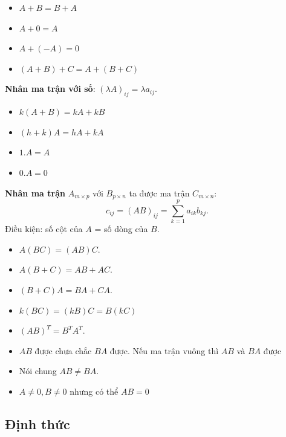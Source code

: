 \documentclass[12pt,a4paper]{article}
\begin{document}
\begin{tinhchat}
  \begin{itemize}
    \item $A + B = B + A$
    \item $A + 0 = A$
    \item $A + (-A) = 0$
    \item $(A + B) + C = A + (B + C)$
  \end{itemize}
\end{tinhchat}

\begin{dinhnghia}
  \textbf{Nhân ma trận với số}: $(\lambda A)_{ij} = \lambda a_{ij}$.
\end{dinhnghia}

\begin{tinhchat}
  \begin{itemize}
    \item $k(A + B) = kA + kB$
    \item $(h + k)A = hA + kA$
    \item $1.A = A$
    \item $0.A = 0$
  \end{itemize}
\end{tinhchat}

\begin{dinhnghia}
  \textbf{Nhân ma trận} $A_{m \times p}$ với $B_{p \times n}$ ta được ma trận $C_{m \times n}$:
  \[
    c_{ij} = (AB)_{ij} = \sum_{k=1}^{p} a_{ik} b_{kj}.
  \]
  Điều kiện: số cột của $A$ = số dòng của $B$.
\end{dinhnghia}

\begin{tinhchat}
  \begin{itemize}
    \item $A(BC) = (AB)C$.
    \item $A(B + C) = AB + AC$.
    \item $(B + C)A = BA + CA$.
    \item $k(BC) = (kB)C = B(kC)$
    \item $(AB)^T = B^T A^T$.
    \item $AB$ được chưa chắc $BA$ được. Nếu ma trận vuông thì $AB$ và $BA$ được
    \item Nói chung $AB \ne BA$.
    \item $A \ne 0, B \ne 0$ nhưng có thể $AB = 0$
  \end{itemize}
\end{tinhchat}

\subsection{Định thức}
\end{document}
